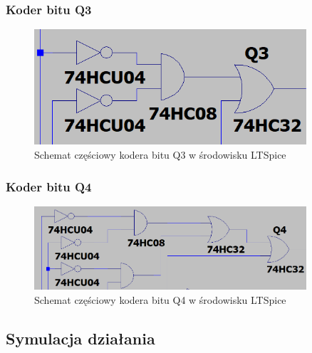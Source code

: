 \documentclass{article}
\begin{document}
\subsubsection{Koder bitu Q3}
\begin{figure}[H]
    \centering
    \begin{adjustbox}{center}
        \includegraphics[width=0.9\textwidth]{q3-r.png}
    \end{adjustbox}
    \caption{Schemat częściowy kodera bitu Q3 w środowisku LTSpice}
    \label{fig:mojobrazek}
\end{figure}
\subsubsection{Koder bitu Q4}
\begin{figure}[H]
    \centering
    \begin{adjustbox}{center}
        \includegraphics[width=0.9\textwidth]{q4-r.png}
    \end{adjustbox}
    \caption{Schemat częściowy kodera bitu Q4 w środowisku LTSpice}
    \label{fig:mojobrazek}
\end{figure}
\newpage
\subsection{Symulacja działania}
\end{document}
